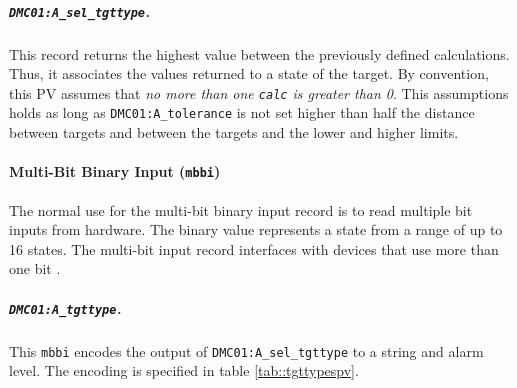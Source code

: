         \subparagraph{\texttt{DMC01:A\_sel\_tgttype}.}
            This record returns the highest value between the previously defined calculations.
            Thus, it associates the values returned to a state of the target.
            By convention, this PV assumes that \emph{no more than one \texttt{calc} is greater than 0}.
            This assumptions holds as long as \texttt{DMC01:A\_tolerance} is not set higher than half the distance between targets and between the targets and the lower and higher limits.

    \paragraph{Multi-Bit Binary Input (\texttt{mbbi})}
        The normal use for the multi-bit binary input record is to read multiple bit inputs from hardware.
        The binary value represents a state from a range of up to 16 states.
        The multi-bit input record interfaces with devices that use more than one bit \cite{stanley1998}.
    
        \subparagraph{\texttt{DMC01:A\_tgttype}.}
            This \texttt{mbbi} encodes the output of \texttt{DMC01:A\_sel\_tgttype} to a string and alarm level.
            The encoding is specified in table \ref{tab::tgttypespv}.

